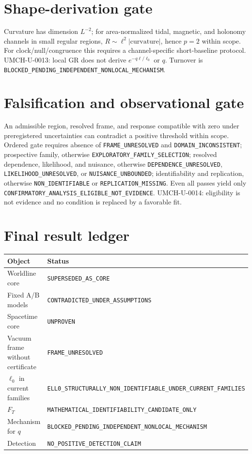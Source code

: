 \documentclass[11pt,a4paper]{article}
\begin{document}
\section{Shape-derivation gate}\label{sec:u-shape}
Curvature has dimension $L^{-2}$; for area-normalized tidal, magnetic, and holonomy channels in small regular regions, $R\sim\ell^2|\mathrm{curvature}|$, hence $p=2$ within scope. For clock/null/congruence this requires a channel-specific short-baseline protocol. UMCH-U-0013: local GR does not derive $e^{-q\ell/\ell_0}$ or $q$. Turnover is \verb|BLOCKED_PENDING_INDEPENDENT_NONLOCAL_MECHANISM|.

\section{Falsification and observational gate}\label{sec:u-falsification}
An admissible region, resolved frame, and response compatible with zero under preregistered uncertainties can contradict a positive threshold within scope. Ordered gate requires absence of \verb|FRAME_UNRESOLVED| and \verb|DOMAIN_INCONSISTENT|; prospective family, otherwise \verb|EXPLORATORY_FAMILY_SELECTION|; resolved dependence, likelihood, and nuisance, otherwise \verb|DEPENDENCE_UNRESOLVED|, \verb|LIKELIHOOD_UNRESOLVED|, or \verb|NUISANCE_UNBOUNDED|; identifiability and replication, otherwise \verb|NON_IDENTIFIABLE| or \verb|REPLICATION_MISSING|. Even all passes yield only \verb|CONFIRMATORY_ANALYSIS_ELIGIBLE_NOT_EVIDENCE|. UMCH-U-0014: eligibility is not evidence and no condition is replaced by a favorable fit.

\section{Final result ledger}\label{sec:u-results}
\begin{center}\begin{tabular}{p{.48\linewidth}p{.43\linewidth}}\toprule
Object&Status\\\midrule
Worldline core&\verb|SUPERSEDED_AS_CORE|\\
Fixed A/B models&\verb|CONTRADICTED_UNDER_ASSUMPTIONS|\\
Spacetime core&\verb|UNPROVEN|\\
Vacuum frame without certificate&\verb|FRAME_UNRESOLVED|\\
$\ell_0$ in current families&\verb|ELL0_STRUCTURALLY_NON_IDENTIFIABLE_UNDER_CURRENT_FAMILIES|\\
$F_T$&\verb|MATHEMATICAL_IDENTIFIABILITY_CANDIDATE_ONLY|\\
Mechanism for $q$&\verb|BLOCKED_PENDING_INDEPENDENT_NONLOCAL_MECHANISM|\\
Detection&\verb|NO_POSITIVE_DETECTION_CLAIM|\\\bottomrule\end{tabular}\end{center}
\end{document}
